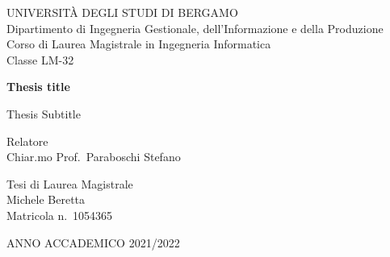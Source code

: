 \begin{titlepage}
  \begin{center}
    \large
    UNIVERSITÀ DEGLI STUDI DI BERGAMO \\
    \vspace{0.5cm}
    \normalsize
    Dipartimento di Ingegneria Gestionale, dell'Informazione e della Produzione \\
    Corso di Laurea Magistrale in Ingegneria Informatica \\
    Classe LM-32

    \vspace*{3cm}

    \Huge
    \textbf{Thesis title}

    \vspace{0.5cm}
    \LARGE
    Thesis Subtitle
  \end{center}

  \vfill

  \begin{flushleft}
    Relatore \\
    Chiar.mo Prof.\ Paraboschi Stefano
  \end{flushleft}

  \vspace{1cm}

  \begin{flushright}
    Tesi di Laurea Magistrale \\
    Michele Beretta \\
    Matricola n.\ 1054365
  \end{flushright}

  \vfill

  \begin{center}
    ANNO ACCADEMICO 2021/2022
  \end{center}
\end{titlepage}